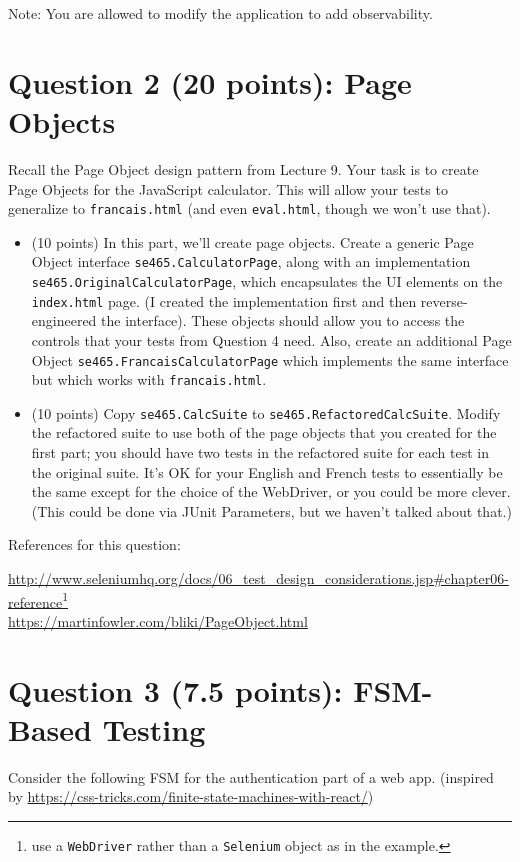 \documentclass[10pt,hidelinks]{article}
\begin{document}
Note: You are allowed to modify the application to add observability.


\section*{Question 2 (20 points): Page Objects}

Recall the Page Object design pattern from Lecture 9. Your task is to create Page Objects for the JavaScript calculator. This will allow your tests to generalize to {\tt francais.html} (and even
{\tt eval.html}, though we won't use that).

\begin{itemize}
\item (10 points) In this part, we'll create page objects. Create a generic Page Object interface {\tt se465.CalculatorPage}, along with an implementation {\tt se465.OriginalCalculatorPage}, which encapsulates the UI elements on the {\tt index.html} page. (I created the implementation first and then reverse-engineered the interface). These objects should allow you to access the controls that your tests from Question 4 need. Also, create an additional Page Object {\tt se465.FrancaisCalculatorPage} which implements the same interface but which works with {\tt francais.html}. 
  \item (10 points) Copy {\tt se465.CalcSuite} to {\tt se465.RefactoredCalcSuite}. Modify the refactored suite to use both of the page objects that you created for the first part; you should have two tests in the refactored suite for each test in the original suite. It's OK for your English and French tests to essentially be the same except for the choice of the WebDriver, or you could be more clever. (This could be done via JUnit Parameters, but we haven't talked about that.)
\end{itemize}

References for this question:

\url{http://www.seleniumhq.org/docs/06_test_design_considerations.jsp#chapter06-reference}\footnote{use a {\tt WebDriver} rather than a {\tt Selenium} object as in the example.}
\\
\url{https://martinfowler.com/bliki/PageObject.html}

\section*{Question 3 (7.5 points): FSM-Based Testing}
Consider the following FSM for the authentication part of a web app.
(inspired by \url{https://css-tricks.com/finite-state-machines-with-react/})
\end{document}
